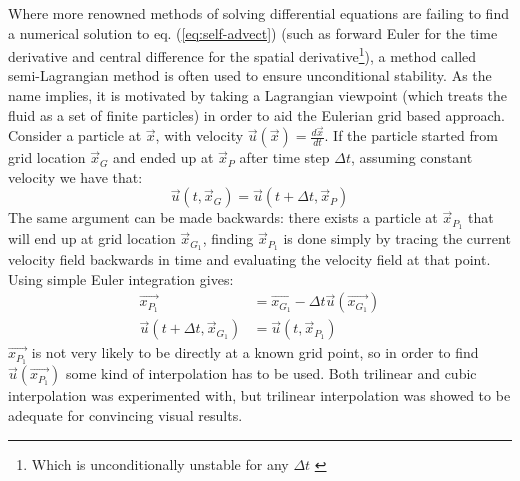 Where more renowned methods of solving differential equations are failing to find a numerical solution to eq. (\ref{eq:self-advect}) (such as forward Euler for the time derivative and central difference for the spatial derivative\footnote{Which is unconditionally unstable for any \begin{math}\Delta t\end{math} \cite[p.~28]{bridson}}), a method called semi-Lagrangian method is often used to ensure unconditional stability. As the name implies, it is motivated by taking a Lagrangian viewpoint (which treats the fluid as a set of finite particles) in order to aid the Eulerian grid based approach. Consider a particle at  \begin{math}\vec{x}\end{math}, with velocity \begin{math}\vec{u}(\vec{x}) = \frac{d\vec{x}}{dt}\end{math}. If the particle started from grid location \begin{math}\vec{x}_G\end{math} and ended up at \begin{math}\vec{x}_P\end{math} after time step \begin{math}\Delta t \end{math}, assuming constant velocity we have that: 
\begin{equation}
\vec{u}(t,\vec{x}_G) = \vec{u}(t+\Delta t,\vec{x}_P)  
\end{equation}
The same argument can be made backwards: there exists a particle at \begin{math}\vec{x}_{P_1} \end{math} that will end up at grid location \begin{math}\vec{x}_{G_1}\end{math}, finding \begin{math}\vec{x}_{P_1}\end{math} is done simply by tracing the current velocity field backwards in time and evaluating the velocity field at that point. Using simple Euler integration gives: 
	\begin{align}
					      \label{eq:lagrangian}\vec{x_{P_1}}  & =    \vec{x_{G_1}} -  \Delta t \vec{u}(\vec{x_{G_1}})  \\ 
		\vec{u}(t + \Delta t,\vec{x}_{G_1}) &  =    \vec{u}(t,\vec{x}_{P_1}) 
	\end{align}
\begin{math} \vec{x_{P_1}} \end{math} is not very likely to be directly at a known grid point, so in order to find \begin{math} \vec{u}(\vec{x_{P_1}}) \end{math} some kind of interpolation has to be used. Both trilinear and cubic interpolation was experimented with, but trilinear interpolation was showed to be adequate for convincing visual results. 